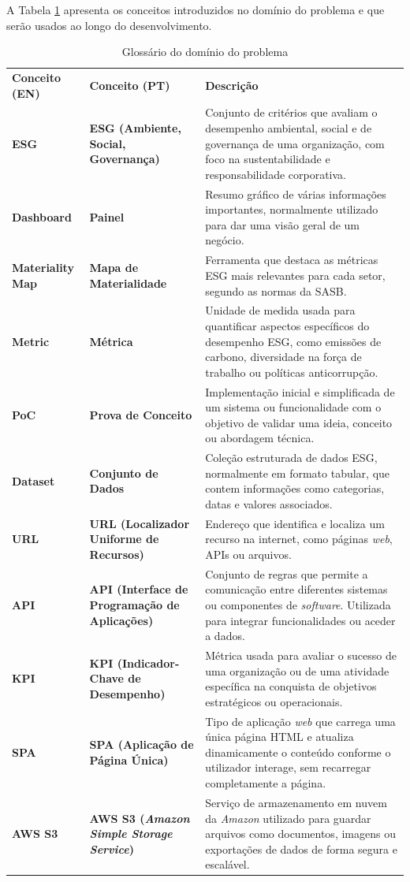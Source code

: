 A Tabela \ref{tab:glossario_dominio} apresenta os conceitos introduzidos no domínio do problema e que serão usados ao longo do desenvolvimento.

\begin{table}[H]
    \renewcommand{\arraystretch}{1.2}
    \setlength{\tabcolsep}{10pt}
    \centering
    \begin{tabular}{>{\bfseries}p{2.5cm} >{\bfseries}p{4cm} p{8cm}}
        \rowcolor{purple!40}
        Conceito (EN) & Conceito (PT) & \textbf{Descrição} \\
        ESG & ESG (Ambiente, Social, Governança) & Conjunto de critérios que avaliam o desempenho ambiental, social e de governança de uma organização, com foco na sustentabilidade e responsabilidade corporativa. \\
        Dashboard & Painel & Resumo gráfico de várias informações importantes, normalmente utilizado para dar uma visão geral de um negócio. \\
        Materiality Map & Mapa de Materialidade & Ferramenta que destaca as métricas ESG mais relevantes para cada setor, segundo as normas da SASB. \\
        Metric & Métrica & Unidade de medida usada para quantificar aspectos específicos do desempenho ESG, como emissões de carbono, diversidade na força de trabalho ou políticas anticorrupção. \\
        PoC & Prova de Conceito & Implementação inicial e simplificada de um sistema ou funcionalidade com o objetivo de validar uma ideia, conceito ou abordagem técnica. \\
        Dataset & Conjunto de Dados & Coleção estruturada de dados ESG, normalmente em formato tabular, que contem informações como categorias, datas e valores associados. \\
        URL & URL (Localizador Uniforme de Recursos) & Endereço que identifica e localiza um recurso na internet, como páginas \textit{web}, APIs ou arquivos. \\
        API & API (Interface de Programação de Aplicações) & Conjunto de regras que permite a comunicação entre diferentes sistemas ou componentes de \textit{software}. Utilizada para integrar funcionalidades ou aceder a dados. \\
        KPI & KPI (Indicador-Chave de Desempenho) & Métrica usada para avaliar o sucesso de uma organização ou de uma atividade específica na conquista de objetivos estratégicos ou operacionais. \\
        SPA & SPA (Aplicação de Página Única) & Tipo de aplicação \textit{web} que carrega uma única página HTML e atualiza dinamicamente o conteúdo conforme o utilizador interage, sem recarregar completamente a página. \\
        AWS S3 & AWS S3 (\textit{Amazon Simple Storage Service}) & Serviço de armazenamento em nuvem da \textit{Amazon} utilizado para guardar arquivos como documentos, imagens ou exportações de dados de forma segura e escalável. \\
    \end{tabular}
    \caption{Glossário do domínio do problema}
    \label{tab:glossario_dominio}
\end{table}

